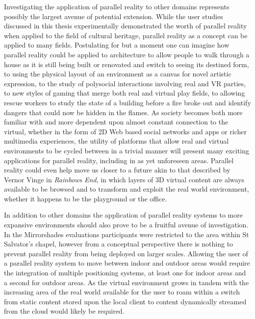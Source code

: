 Investigating the application of parallel reality to other domains represents possibly the largest avenue of potential extension. While the user studies discussed in this thesis experimentally demonstrated the worth of parallel reality when applied to the field of cultural heritage, parallel reality as a concept can be applied to many fields. Postulating for but a moment one can imagine how parallel reality could be applied to architecture to allow people to walk through a house as it is still being built or renovated and switch to seeing its destined form, to using the physical layout of an environment as a canvas for novel artistic expression, to the study of polysocial interactions involving real and VR parties, to new styles of gaming that merge both real and virtual play fields, to allowing rescue workers to study the state of a building before a fire broke out and identify dangers that could now be hidden in the flames. As society becomes both more familiar with and more dependent upon almost constant connection to the virtual, whether in the form of 2D Web based social networks and apps or richer multimedia experiences, the utility of platforms that allow real and virtual environments to be cycled between in a trivial manner will present many exciting applications for parallel reality, including in as yet unforeseen areas. Parallel reality could even help move us closer to a future akin to that described by Vernor Vinge in \textit{Rainbows End}, in which layers of 3D virtual content are always available to be browsed and to transform and exploit the real world environment, whether it happens to be the playground or the office.

In addition to other domains the application of parallel reality systems to more expansive environments should also prove to be a fruitful avenue of investigation. In the Mirrorshades evaluations participants were restricted to the area within St Salvator's chapel, however from a conceptual perspective there is nothing to prevent parallel reality from being deployed on larger scales. Allowing the user of a parallel reality system to move between indoor and outdoor areas would require the integration of multiple positioning systems, at least one for indoor areas and a second for outdoor areas. As the virtual environment grows in tandem with the increasing area of the real world available for the user to roam within a switch from static content stored upon the local client to content dynamically streamed from the cloud would likely be required.

